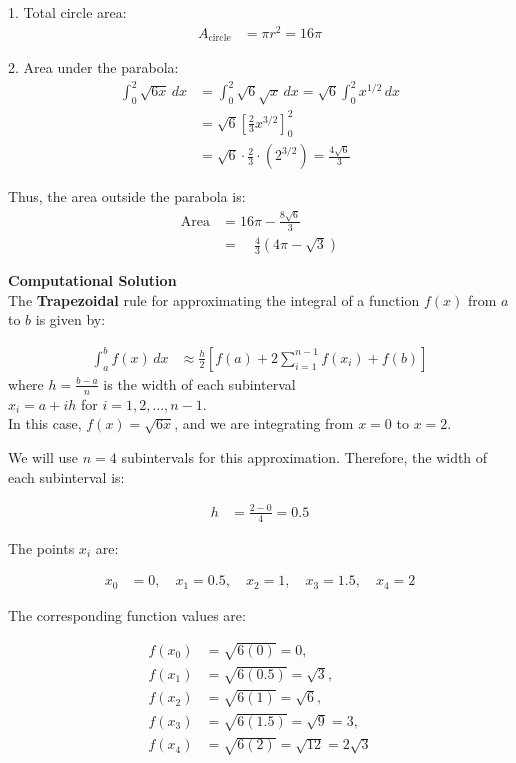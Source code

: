 \documentclass[journal]{IEEEtran}
\begin{document}
1. Total circle area:
\begin{align*}
A_{\text{circle}} &= \pi r^2 = 16\pi
\end{align*}

2. Area under the parabola:
\begin{align*}
\int_0^2 \sqrt{6x} \, dx &= \int_0^2 \sqrt{6} \sqrt{x} \, dx = \sqrt{6} \int_0^2 x^{1/2} \, dx \\
&= \sqrt{6} \left[\frac{2}{3}x^{3/2}\right]_0^2 \\
&= \sqrt{6} \cdot \frac{2}{3} \cdot (2^{3/2}) = \frac{4\sqrt{6}}{3}
\end{align*}

Thus, the area outside the parabola is:
\begin{align*}
\text{Area} &= 16\pi - \frac{8\sqrt{6}}{3} \\
&= \quad \frac{4}{3}(4\pi - \sqrt{3})
\end{align*}




\textbf{Computational Solution}\\

The \textbf{Trapezoidal} rule for approximating the integral of a function \(f(x)\) from \(a\) to \(b\) is given by:

\begin{align*}
\int_a^b f(x) \, dx &\approx \frac{h}{2} \left[ f(a) + 2 \sum_{i=1}^{n-1} f(x_i) + f(b) \right]
\end{align*}
where \(h = \frac{b - a}{n}\) is the width of each subinterval\\
 \(x_i = a + ih\) for \(i = 1, 2, \dots, n-1\).\\

In this case, \(f(x) = \sqrt{6x}\), and we are integrating from \(x = 0\) to \(x = 2\).


We will use \(n = 4\) subintervals for this approximation. Therefore, the width of each subinterval is:

\begin{align*}
h &= \frac{2 - 0}{4} = 0.5
\end{align*}

The points \(x_i\) are:

\begin{align*}
x_0 &= 0, \quad x_1 = 0.5, \quad x_2 = 1, \quad x_3 = 1.5, \quad x_4 = 2
\end{align*}

The corresponding function values are:

\begin{align*}
f(x_0) &= \sqrt{6(0)} = 0, \\
f(x_1) &= \sqrt{6(0.5)} = \sqrt{3}, \\
f(x_2) &= \sqrt{6(1)} = \sqrt{6}, \\
f(x_3) &= \sqrt{6(1.5)} = \sqrt{9} = 3, \\
f(x_4) &= \sqrt{6(2)} = \sqrt{12} = 2\sqrt{3}
\end{align*}
\end{document}
